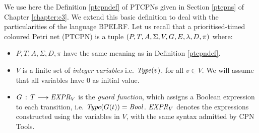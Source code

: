 \begin{definition} 
We use here the Definition \ref{ptcpndef} of PTCPNs given in Section \ref{ptcpns} of Chapter \ref{chapter:c3}. 
We extend this basic definition to deal with the particularities of the language BPELRF. Let us recall 
that a prioritised-timed coloured Petri net (PTCPN) is a tuple $(P,T,A,\Sigma,V,G,E,\lambda,D,\pi)$ where:

\begin{itemize}
\item $P, T, A, \Sigma, D, \pi$ have the same meaning as in Definition \ref{ptcpndef}.
\item $V$ is a finite set of {\em integer variables}
i.e. ${\it Type}(v)$, for all $v \in V$.
We will assume that all variables have $0$ as initial value.
%
%
\item $G\,:\, T \longrightarrow {\it EXPR}_V$ is the
{\em guard function}, which assigns a Boolean
expression to each transition, i.e. ${\it Type}(G(t))={\it Bool}$.
${\it EXPR}_V$ denotes the
expressions constructed using the variables in $V$,
with the same syntax admitted by CPN Tools.
%


\end{itemize}
\end{definition}
